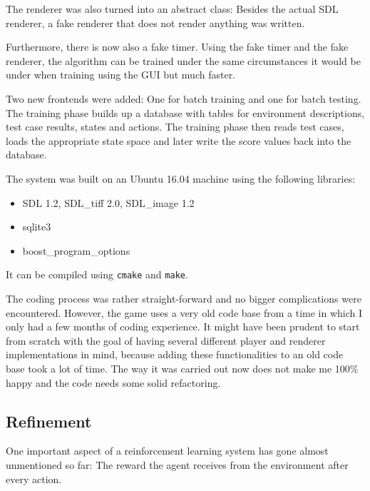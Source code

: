 \documentclass[a4paper,10pt]{article}
\begin{document}
The renderer was also turned into an abstract class:
Besides the actual SDL renderer, a fake renderer that does not render anything was written.

Furthermore, there is now also a fake timer.
Using the fake timer and the fake renderer, the algorithm can be trained under the same circumstances it would be under when training using the GUI but much faster.

Two new frontends were added: One for batch training and one for batch testing.
The training phase builds up a database with tables for environment descriptions, test case results, states and actions.
The training phase then reads test cases, loads the appropriate state space and later write the score values back into the database.

The system was built on an Ubuntu 16.04 machine using the following libraries:
\begin{itemize}
 \item SDL 1.2, SDL\_tiff 2.0, SDL\_image 1.2
 \item sqlite3
 \item boost\_program\_options
\end{itemize}
It can be compiled using \texttt{cmake} and \texttt{make}.



The coding process was rather straight-forward and no bigger complications were encountered.
However, the game uses a very old code base from a time in which I only had a few months of coding experience.
It might have been prudent to start from scratch with the goal of having several different player and renderer implementations in mind, because adding these functionalities to an old code base took a lot of time.
The way it was carried out now does not make me 100\% happy and the code needs some solid refactoring.


\subsection{Refinement}

One important aspect of a reinforcement learning system has gone almost unmentioned so far: The reward the agent receives from the environment after every action.
\end{document}
